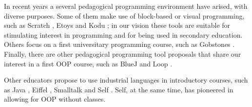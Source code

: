 


In recent years a several pedagogical programming environment have arised, with diverse purposes.
Some of them make use of block-based or visual programming, 
such as Scratch \cite{malan_scratch_2007}, Etoys \cite{lee_empowering_2011} and Kodu \cite{kodu};
in our vision these tools are suitable for stimulating interest in programming and for being used in secondary education.
Others focus on a first universitary programming course, such as Gobstones \cite{lopez_nombre_2012}
.
Finally, there are other pedagogical programming tool proposals that share our interest in a first OOP course, such as BlueJ \cite{bennedsen_bluej_2010} and Loop \cite{griggio_programming_2011}.

Other educators propose to use industrial languages in introductory courses, such as Java \cite{kolling2001guidelines}, Eiffel \cite{meyer1993towards}, Smalltalk \cite{ducasse2006squeak}
and Self \cite{Unga87a}.
Self, at the same time, has pioneered in allowing for OOP without classes.
